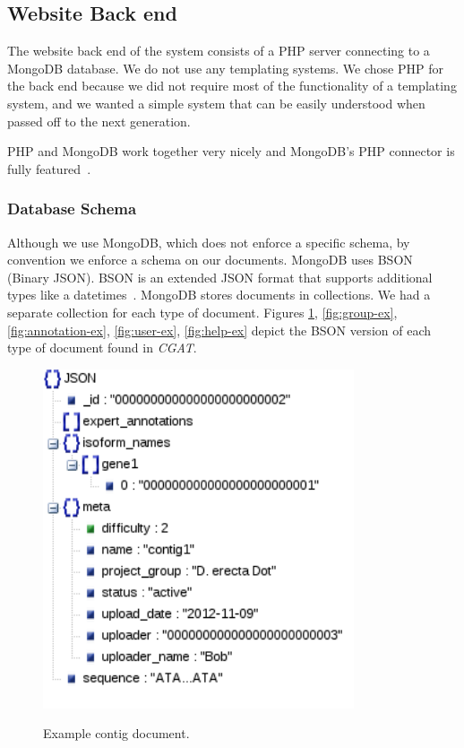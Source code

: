 \documentclass[12pt]{ucthesis}
\newcommand{\captionfonts}{\small\bf\ssp}
\begin{document}
\subsection{Website Back end}
The website back end of the system consists of a PHP server connecting to a MongoDB database.
We do not use any templating systems. We chose PHP for the back end because we did not require most of the functionality of a templating system, and we wanted a simple system that can be easily understood when passed off to the next generation.

PHP and MongoDB work together very nicely and MongoDB's PHP connector is fully featured~\cite{phpMongo}.

\subsubsection{Database Schema}
Although we use MongoDB, which does not enforce a specific schema, by convention we enforce a schema on our documents. MongoDB uses BSON (Binary JSON). BSON is an extended JSON format that supports additional types like a datetimes~\cite{bson}. MongoDB stores documents in collections. We had a separate collection for
each type of document. Figures \ref{fig:contig-ex}, \ref{fig:group-ex}, \ref{fig:annotation-ex}, \ref{fig:user-ex}, \ref{fig:help-ex} depict the BSON version of each type of document found in \textit{CGAT}.


\begin{figure}[H]
\begin{center}
\includegraphics[height=100mm]{contig.png}
\captionfonts
\caption[Contig Document]{Example contig document.}
\label{fig:contig-ex}
\end{center}
\end{figure}
\end{document}
